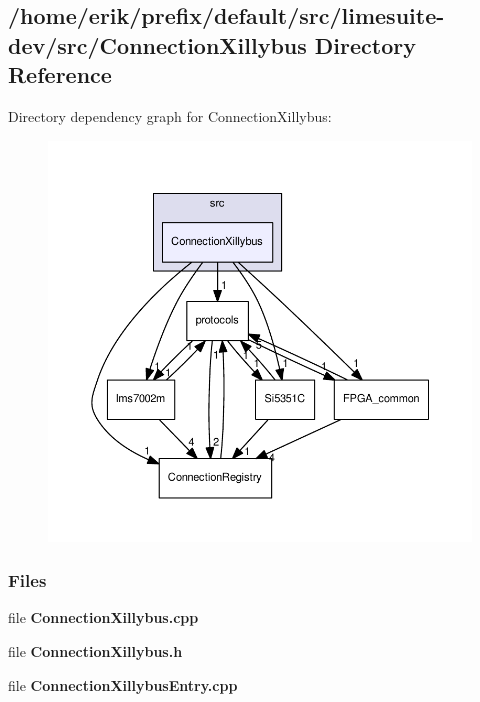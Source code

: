 \subsection{/home/erik/prefix/default/src/limesuite-\/dev/src/\+Connection\+Xillybus Directory Reference}
\label{dir_ba731fc5e5294b310c888a6b5dcfa414}
Directory dependency graph for Connection\+Xillybus\+:
\nopagebreak
\begin{figure}[H]
\begin{center}
\leavevmode
\includegraphics[width=350pt]{dir_ba731fc5e5294b310c888a6b5dcfa414_dep}
\end{center}
\end{figure}
\subsubsection*{Files}
\begin{DoxyCompactItemize}
\item 
file {\bf Connection\+Xillybus.\+cpp}
\item 
file {\bf Connection\+Xillybus.\+h}
\item 
file {\bf Connection\+Xillybus\+Entry.\+cpp}
\end{DoxyCompactItemize}
